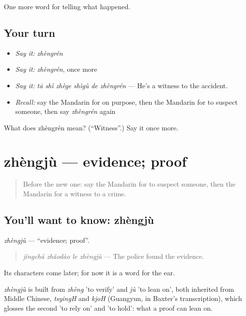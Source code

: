 \begin{grammarlens}[title={What you've built}]
One more word for telling what happened.
\end{grammarlens}

\subsection*{Your turn}
\begin{itemize}
\raggedright
  \item \emph{Say it:} \emph{zhèngrén}
  \item \emph{Say it:} \emph{zhèngrén}, once more
  \item \emph{Say it:} \emph{tā shì zhège shìgù de zhèngrén} — He's a witness to the accident.
  \item \emph{Recall:} say the Mandarin for on purpose, then the Mandarin for to suspect someone, then say \emph{zhèngrén} again
\end{itemize}

\begin{tcolorbox}[breakable,colback=teal!4,colframe=teal!35!black,title={Before you move on}]
What does zhèngrén mean? (\textquotedblleft{}Witness\textquotedblright{}.) Say it once more.
\end{tcolorbox}
\section[zhèngjù]{zhèngjù — evidence; proof}

\label{lesson:ZH-C310-zhengju}



\begin{quote}
Before the new one: say the Mandarin for to suspect someone, then the Mandarin for a witness to a crime.
\end{quote}

\subsection*{You'll want to know: zhèngjù}
\emph{zhèngjù} — \textquotedblleft{}evidence; proof\textquotedblright{}.

\begin{quote}
\emph{jǐngchá zhǎodào le zhèngjù} — The police found the evidence.
\end{quote}

Its characters come later; for now it is a word for the ear.

\begin{cousinweb}
\emph{zhèngjù} is built from \emph{zhèng} 'to verify' and \emph{jù} 'to lean on', both inherited from Middle Chinese, \emph{tsyingH} and \emph{kjoH} (Guangyun, in Baxter's transcription), which glosses the second 'to rely on' and 'to hold': what a proof can lean on.
\end{cousinweb}

